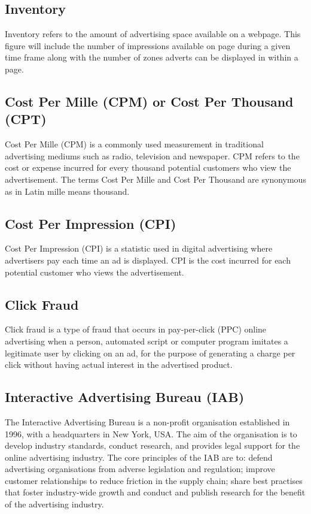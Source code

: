 \documentclass[12pt]{article}
\begin{document}
\subsection{Inventory}
Inventory refers to the amount of advertising space available on a webpage. This figure will include the number of impressions available on page during a given time frame along with the number of zones adverts can be displayed in within a page. 

\subsection{Cost Per Mille (CPM) or Cost Per Thousand (CPT)} \label{cpm}
Cost Per Mille (CPM) is a commonly used measurement in traditional advertising mediums such as radio, television and newspaper. CPM refers to the cost or expense incurred for every thousand potential customers who view the advertisement. The terms Cost Per Mille and Cost Per Thousand are synonymous as in Latin mille means thousand. 

\subsection{Cost Per Impression (CPI)}
Cost Per Impression (CPI) is a statistic used in digital advertising where advertisers pay each time an ad is displayed. CPI is the cost incurred for each potential customer who views the advertisement.

\subsection{Click Fraud}
Click fraud is a type of fraud that occurs in pay-per-click (PPC) online advertising when a person, automated script or computer program imitates a legitimate user by clicking on an ad, for the purpose of generating a charge per click without having actual interest in the advertised product.

\subsection{Interactive Advertising Bureau (IAB)}
The Interactive Advertising Bureau is a non-profit organisation established in 1996, with a headquarters in New York, USA. The aim of the organisation is to develop industry standards, conduct research, and provides legal support for the online advertising industry. The core principles of the IAB are to: defend advertising organisations from adverse legislation and regulation; improve customer relationships to reduce friction in the supply chain; share best practises that foster industry-wide growth and conduct and publish research for the benefit of the advertising industry.
\end{document}

